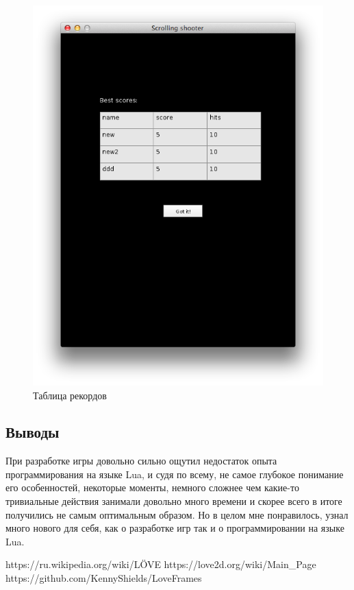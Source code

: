\documentclass[12pt]{article}
\begin{document}
\begin{figure}[!htb]
  \centering
    \includegraphics[scale=0.5]{pics/records.png}
   \caption{Таблица рекордов}
    \label{fig:start}
\end{figure}

\subsection*{Выводы}
При разработке игры довольно сильно ощутил недостаток опыта программирования
на языке Lua, и судя по всему, не самое глубокое понимание его особенностей,
некоторые моменты, немного сложнее чем какие-то тривиальные действия
занимали довольно много времени и скорее всего в итоге получились не самым оптимальным образом.
Но в целом мне понравилось, узнал много нового для себя, как о разработке игр так и о программировании
на языке Lua.

\begin{thebibliography}{}
 https://ru.wikipedia.org/wiki/LÖVE
 https://love2d.org/wiki/Main\_Page
 https://github.com/KennyShields/LoveFrames
\end{thebibliography}
\end{document}
